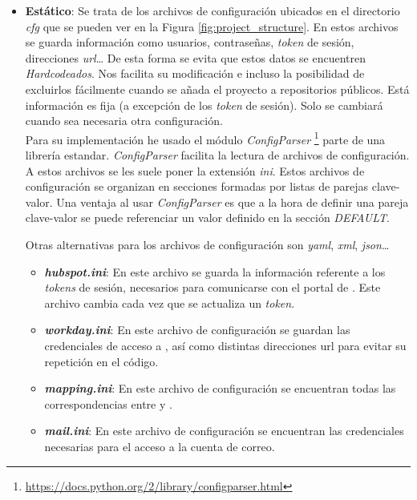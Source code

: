 \begin{itemize}[leftmargin=*]
\item \textbf{Estático}: Se trata de los archivos de configuración ubicados en el directorio \textit{cfg} que se pueden ver en la Figura \ref{fig:project_structure}.
En estos archivos se guarda información como usuarios, contraseñas, \textit{token} de sesión, direcciones \textit{url}\ldots
De esta forma se evita que estos datos se encuentren \textit{Hardcodeados}. Nos facilita su modificación e
incluso la posibilidad de excluirlos fácilmente cuando se añada el proyecto a repositorios públicos.
Está información es fija (a excepción de los \textit{token} de sesión). Solo se cambiará cuando sea necesaria otra configuración.\\

Para su implementación he usado el módulo \textit{ConfigParser} \footnote{\url{https://docs.python.org/2/library/configparser.html}} parte de una librería estandar. \textit{ConfigParser} facilita la lectura de archivos de configuración. A estos archivos se les suele poner la extensión \textit{ini}. %
Estos archivos de configuración se organizan en secciones formadas por listas de parejas clave-valor.
Una ventaja al usar \textit{ConfigParser} es que a la hora de definir una pareja clave-valor se puede referenciar un valor definido en la sección \textit{DEFAULT}. 


Otras alternativas para los archivos de configuración son \textit{yaml}, \textit{xml}, \textit{json}\ldots


\begin{itemize}
	\item [\textendash] \textbf{\textit{hubspot.ini}}: En este archivo se guarda la información referente a los \textit{tokens} de sesión, necesarios para comunicarse con el portal de \hs. 
	Este archivo cambia cada vez que se actualiza un \textit{token}.
	\item [\textendash] \textbf{\textit{workday.ini}}: En este archivo de configuración se 
	guardan las credenciales de acceso a \wday{}, así como distintas direcciones url para evitar su repetición en el código.
	\item [\textendash] \textbf{\textit{mapping.ini}}: En este archivo de configuración se encuentran todas las correspondencias entre \hs{} y \wday.
	\item [\textendash] \textbf{\textit{mail.ini}}: En este archivo de configuración se encuentran las credenciales necesarias para el acceso a la cuenta de correo.
\end{itemize}





\end{itemize}
